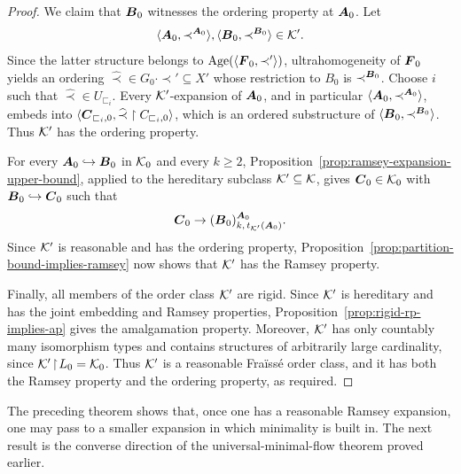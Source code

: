 \begin{proof}
    We claim that \(\boldsymbol{B}_0\) witnesses the ordering property at \(\boldsymbol{A}_0\).
    Let
    \[
        \langle\boldsymbol{A}_0,\prec^{\boldsymbol{A}_0}\rangle,
        \langle\boldsymbol{B}_0,\prec^{\boldsymbol{B}_0}\rangle\in\mathcal{K}'.
    \]
    Since the latter structure belongs to
    \(\operatorname{Age}(\langle\boldsymbol{F}_0,\prec'\rangle)\), ultrahomogeneity of \(\boldsymbol{F}_0\)
    yields an ordering \(\widehat{\prec}\in G_0\cdot\prec'\subseteq X'\) whose
    restriction to \(B_0\) is \(\prec^{\boldsymbol{B}_0}\). Choose \(i\) such that
    \(\widehat{\prec}\in U_{\sqsubset_i}\). Every \(\mathcal{K}'\)-expansion of
    \(\boldsymbol{A}_0\), and in particular
    \(\langle\boldsymbol{A}_0,\prec^{\boldsymbol{A}_0}\rangle\), embeds into
    \(\langle\boldsymbol{C}_{\sqsubset_i,0},
    \widehat{\prec}\restriction C_{\sqsubset_i,0}\rangle\), which is an ordered
    substructure of \(\langle\boldsymbol{B}_0,\prec^{\boldsymbol{B}_0}\rangle\). Thus \(\mathcal{K}'\)
    has the ordering property.

    For every \(\boldsymbol{A}_0\hookrightarrow\boldsymbol{B}_0\) in \(\mathcal{K}_0\) and every
    \(k\geq 2\), Proposition~\ref{prop:ramsey-expansion-upper-bound}, applied
    to the hereditary subclass \(\mathcal{K}'\subseteq\mathcal{K}\), gives
    \(\boldsymbol{C}_0\in\mathcal{K}_0\) with \(\boldsymbol{B}_0\hookrightarrow\boldsymbol{C}_0\) such that
    \[
        \boldsymbol{C}_0\to(\boldsymbol{B}_0)^{\boldsymbol{A}_0}_{k,\,t_{\mathcal{K}'}(\boldsymbol{A}_0)}.
    \]
    Since \(\mathcal{K}'\) is reasonable and has the ordering property,
    Proposition~\ref{prop:partition-bound-implies-ramsey} now shows that
    \(\mathcal{K}'\) has the Ramsey property.

    Finally, all members of the order class \(\mathcal{K}'\) are rigid. Since \(\mathcal{K}'\)
    is hereditary and has the joint embedding and Ramsey properties,
    Proposition~\ref{prop:rigid-rp-implies-ap} gives the amalgamation property.
    Moreover, \(\mathcal{K}'\) has only countably many isomorphism types and contains
    structures of arbitrarily large cardinality, since
    \(\mathcal{K}'\!\restriction\!L_0=\mathcal{K}_0\). Thus \(\mathcal{K}'\) is a reasonable Fraïssé
    order class, and it has both the Ramsey property and the ordering property,
    as required.
\end{proof}

The preceding theorem shows that, once one has a reasonable Ramsey expansion, one may pass to a smaller expansion in which minimality is built in. The next result is the converse direction of the universal-minimal-flow theorem proved earlier.

